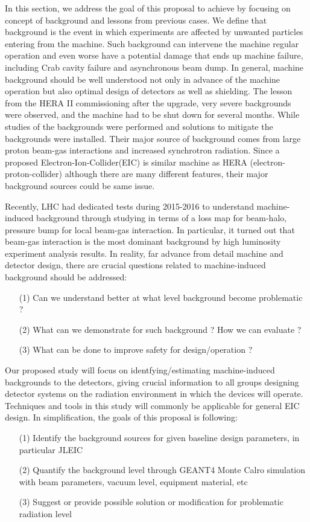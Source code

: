 
In this section, we address the goal of this proposal to achieve by focusing on concept of background and lessons from
previous cases.
We define that background is the event in which experiments are affected by unwanted particles entering from the machine.
Such background can intervene the machine regular operation and even worse have a potential damage that ends up machine
failure, including Crab cavity failure and asynchronous beam dump.
In general, machine background should be well understood not only in advance of the machine operation but also optimal
design of detectors as well as shielding. The lesson from the HERA II commissioning after the upgrade, very severe
backgrounds were observed, and the machine had to be shut down for several months. While studies of the backgrounds
were performed and solutions to mitigate the backgrounds were installed. Their major source of background comes from
large proton beam-gas interactions and increased synchrotron radiation. Since a proposed Electron-Ion-Collider(EIC)
is similar machine as HERA (electron-proton-collider) although there are many different features, their major background
sources could be same issue.


Recently, LHC had dedicated tests during 2015-2016 to understand machine-induced background through studying in terms of
a loss map for beam-halo, pressure bump for local beam-gas interaction. In particular, it turned out that beam-gas interaction
is the most dominant background by high luminosity experiment analysis results\cite{Bruce:2016}.
In reality, far advance from detail machine and detector design, there are crucial questions related to machine-induced background
should be addressed:
\begin{itemize}
\item[(1)] Can we understand better at what level background become problematic ?
\item[(2)] What can we demonstrate for such background ? How we can evaluate ?
\item[(3)] What can be done to improve safety for design/operation ?
\end{itemize}


Our proposed study will focus on identfying/estimating machine-induced backgrounds to the detectors, giving crucial information
to all groups designing detector systems on the radiation environment in which the devices will operate. Techniques and tools in this study
will commonly be applicable for general EIC design.
In simplification, the goals of this proposal is following:
\begin{itemize}
\item[(1)] Identify the background sources for given baseline design parameters, in particular JLEIC
\item[(2)] Quantify the background level through GEANT4 Monte Calro simulation with beam parameters, vacuum level, equipment material, etc
\item[(3)] Suggest or provide possible solution or modification for problematic radiation level
\end{itemize}

